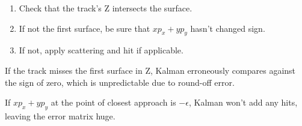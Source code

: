 \begin{slide*}
\begin{minipage}[t]{\linewidth}
\begin{minipage}[b]{7cm}
\begin{enumerate}
  \item Check that the track's Z \mbox{intersects} the surface.

  \item If not the first surface, be sure that $x p_x + y p_y$ hasn't
  changed sign.

  \item If not, apply scattering and hit if applicable.

\end{enumerate}

\vspace{0.3cm}

\end{minipage}

\vspace{0.5cm}

If the track misses the first surface in Z, Kalman erroneously
compares against the sign of zero, which is unpredictable due to
round-off error.

\vspace{0.5cm}

If $x p_x + y p_y$ at the point of closest approach is $-\epsilon$,
Kalman won't add any hits, leaving the error matrix huge.

\end{minipage}

\end{slide*}


